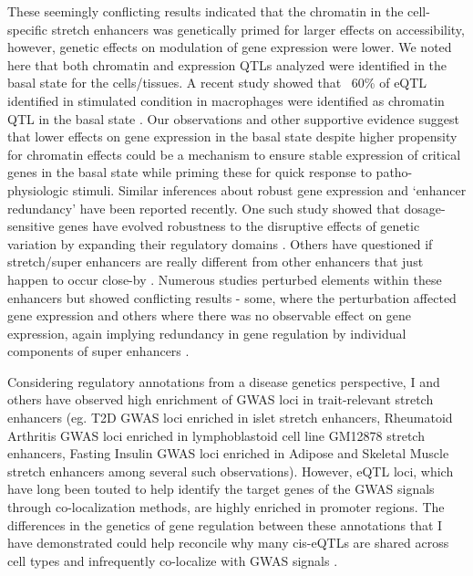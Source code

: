 These seemingly conflicting results indicated that the chromatin in the cell-specific stretch enhancers was genetically primed for larger effects on accessibility, however, genetic effects on modulation of gene expression were lower. We noted here that both chromatin and expression QTLs analyzed were identified in the basal state for the cells/tissues. A recent study showed that ~60\% of eQTL identified in stimulated condition in macrophages were identified as chromatin QTL in the basal state \cite{alasooSharedGeneticEffects2018}. Our observations and other supportive evidence suggest that lower effects on gene expression in the basal state despite higher propensity for chromatin effects could be a mechanism to ensure stable expression of critical genes in the basal state while priming these for quick response to patho-physiologic stimuli. Similar inferences about robust gene expression and ‘enhancer redundancy’ have been reported recently. One such study showed that dosage-sensitive genes have evolved robustness to the disruptive effects of genetic variation by expanding their regulatory domains \cite{wangEnhancerRedundancyPredicts2018}. Others have questioned if stretch/super enhancers are really different from other enhancers that just happen to occur close-by \cite{pottWhatAreSuperenhancers2015}. Numerous studies perturbed elements within these enhancers but showed conflicting results - some, where the perturbation affected gene expression and others where there was no observable effect on gene expression, again implying redundancy in gene regulation by individual components of super enhancers \cite{hayGeneticDissectionAglobin2016, shinHierarchyMammarySTAT5driven2016, moorthyEnhancersSuperenhancersHave2017, xieMultiplexedEngineeringAnalysis2017}. 


Considering regulatory annotations from a disease genetics perspective, I and others have observed high enrichment of GWAS loci in trait-relevant stretch enhancers (eg. T2D GWAS loci enriched in islet stretch enhancers, Rheumatoid Arthritis GWAS loci enriched in lymphoblastoid cell line GM12878 stretch enhancers, Fasting Insulin GWAS loci enriched in Adipose and Skeletal Muscle stretch enhancers among several such observations). However, eQTL loci, which have long been touted to help identify the target genes of the GWAS signals through co-localization methods, are highly enriched in promoter regions. The differences in the genetics of gene regulation between these annotations that I have demonstrated could help reconcile why many cis-eQTLs are shared across cell types and infrequently co-localize with GWAS signals \cite{liuFunctionalArchitecturesLocal2017, huangFinemappingInflammatoryBowel2017, gtexconsortiumGeneticEffectsGene2017}. 


